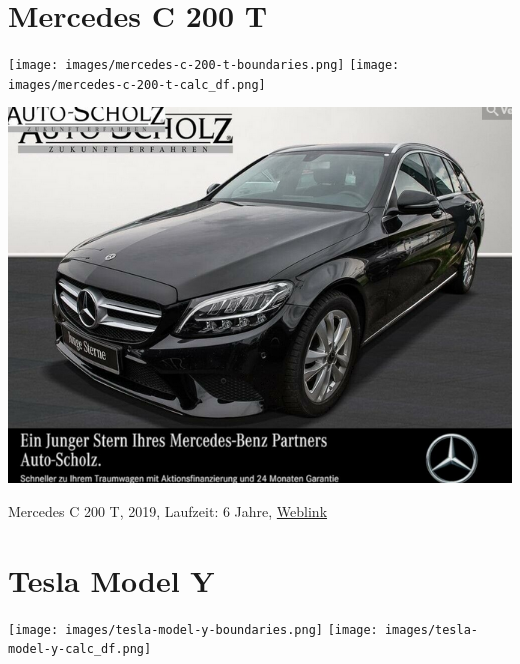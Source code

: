\documentclass[landscape, DIV=99, 14pt]{scrartcl}
\begin{document}
\pagebreak


\twocolumn

\section*{Mercedes C 200 T}
\begin{center}
\texttt{[image: images/mercedes-c-200-t-boundaries.png]}
\null
\vspace{0.5cm}
\texttt{[image: images/mercedes-c-200-t-calc\_df.png]}
\end{center}

\pagebreak
\null
\vspace{2cm}
\begin{center}
\includegraphics[width=0.9\columnwidth]{cars/mercedes-c-200-t.png}

Mercedes C 200 T, 2019, Laufzeit: 6 Jahre, \href{https://suchen.mobile.de/fahrzeuge/details.html?action=parkItem&id=327113608}{Weblink}
\end{center}

\pagebreak


\twocolumn

\section*{Tesla Model Y}
\begin{center}
\texttt{[image: images/tesla-model-y-boundaries.png]}
\null
\vspace{0.5cm}
\texttt{[image: images/tesla-model-y-calc\_df.png]}
\end{center}
\end{document}
